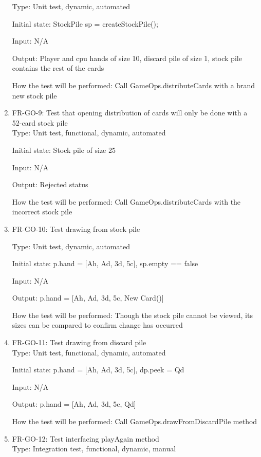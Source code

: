 \documentclass[12pt, titlepage]{article}
\begin{document}
\begin{enumerate}
    Type: Unit test, dynamic, automated
    
    Initial state: StockPile sp = createStockPile();
    
    Input: N/A
    
    Output: Player and cpu hands of size 10, discard pile of size 1, stock pile contains the rest of the cards
    
    How the test will be performed: Call GameOps.distributeCards with a brand new stock pile
    
    \item{FR-GO-9: Test that opening distribution of cards will only be done with a 52-card stock pile\\}
    Type: Unit test, functional, dynamic, automated
    
    Initial state: Stock pile of size 25
    
    Input: N/A
    
    Output: Rejected status
    
    How the test will be performed: Call GameOps.distributeCards with the incorrect stock pile
    
    \item{FR-GO-10: Test drawing from stock pile\\}
    
    Type: Unit test, dynamic, automated
    
    Initial state: p.hand = [Ah, Ad, 3d, 5c], sp.empty == false
    
    Input: N/A
    
    Output: p.hand = [Ah, Ad, 3d, 5c, New Card()]
    
    How the test will be performed: Though the stock pile cannot be viewed, its sizes can be compared to confirm change has occurred
    
    \item{FR-GO-11: Test drawing from discard pile\\}
    Type: Unit test, functional, dynamic, automated
    
    Initial state: p.hand = [Ah, Ad, 3d, 5c], dp.peek = Qd
    
    Input: N/A
    
    Output: p.hand = [Ah, Ad, 3d, 5c, Qd]
    
    How the test will be performed: Call GameOps.drawFromDiscardPile method
    
    \item{FR-GO-12: Test interfacing playAgain method\\}
    Type: Integration test, functional, dynamic, manual
    

\end{enumerate}
\end{document}
